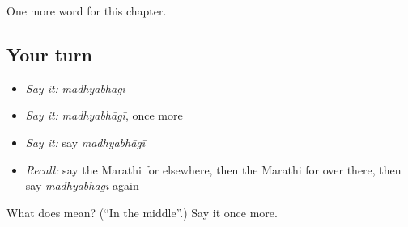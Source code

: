 \begin{grammarlens}[title={What you've built}]
One more word for this chapter.
\end{grammarlens}

\subsection*{Your turn}
\begin{itemize}
\raggedright
  \item \emph{Say it:} \emph{madhyabhāgī}
  \item \emph{Say it:} \emph{madhyabhāgī}, once more
  \item \emph{Say it:} say \emph{madhyabhāgī}
  \item \emph{Recall:} say the Marathi for elsewhere, then the Marathi for over there, then say \emph{madhyabhāgī} again
\end{itemize}

\begin{tcolorbox}[breakable,colback=teal!4,colframe=teal!35!black,title={Before you move on}]
What does  mean? (\textquotedblleft{}In the middle\textquotedblright{}.) Say it once more.
\end{tcolorbox}
